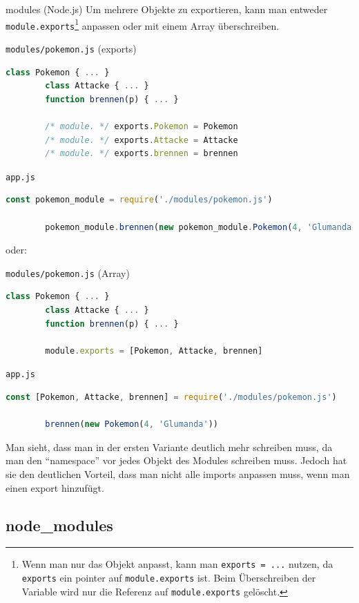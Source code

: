\begin{example}{modules (Node.js)}
    Um mehrere Objekte zu exportieren, kann man entweder \texttt{module.exports}\footnote{
        Wenn man nur das Objekt anpasst, kann man \texttt{exports = ...} nutzen, da \texttt{exports} ein pointer auf \texttt{module.exports} ist.
        Beim Überschreiben der Variable wird nur die Referenz auf \texttt{module.exports} gelöscht.
    } anpassen oder mit einem Array überschreiben.

    \texttt{modules/pokemon.js} (exports)
    \begin{lstlisting}[language=JavaScript]
        class Pokemon { ... }
        class Attacke { ... }
        function brennen(p) { ... }

        /* module. */ exports.Pokemon = Pokemon
        /* module. */ exports.Attacke = Attacke
        /* module. */ exports.brennen = brennen
    \end{lstlisting}

    \texttt{app.js}
    \begin{lstlisting}[language=JavaScript]
        const pokemon_module = require('./modules/pokemon.js')

        pokemon_module.brennen(new pokemon_module.Pokemon(4, 'Glumanda'))
    \end{lstlisting}

    oder:

    \texttt{modules/pokemon.js} (Array)
    \begin{lstlisting}[language=JavaScript]
        class Pokemon { ... }
        class Attacke { ... }
        function brennen(p) { ... }

        module.exports = [Pokemon, Attacke, brennen]
    \end{lstlisting}

    \texttt{app.js}
    \begin{lstlisting}[language=JavaScript]
        const [Pokemon, Attacke, brennen] = require('./modules/pokemon.js')

        brennen(new Pokemon(4, 'Glumanda'))
    \end{lstlisting}

    Man sieht, dass man in der ersten Variante deutlich mehr schreiben muss, da man den \enquote{namespace} vor jedes Objekt des Modules schreiben muss.
    Jedoch hat sie den deutlichen Vorteil, dass man nicht alle imports anpassen muss, wenn man einen export hinzufügt.
\end{example}

\subsection{node\_modules}

